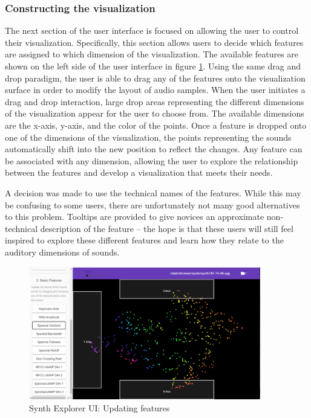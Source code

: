 \subsubsection{Constructing the visualization}
The next section of the user interface is focused on allowing the user to control their visualization. Specifically, this section allows users to decide which features are assigned to which dimension of the visualization. The available features are shown on the left side of the user interface in figure \ref{fig:features}. Using the same drag and drop paradigm, the user is able to drag any of the features onto the visualization surface in order to modify the layout of audio samples. When the user initiates a drag and drop interaction, large drop areas representing the different dimensions of the visualization appear for the user to choose from. The available dimensions are the x-axis, y-axis, and the color of the points. Once a feature is dropped onto one of the dimensions of the visualization, the points representing the sounds automatically shift into the new position to reflect the changes. Any feature can be associated with any dimension, allowing the user to explore the relationship between the features and develop a visualization that meets their needs.

A decision was made to use the technical names of the features. While this may be confusing to some users, there are unfortunately not many good alternatives to this problem. Tooltips are provided to give novices an approximate non-technical description of the feature -- the hope is that these users will still feel inspired to explore these different features and learn how they relate to the auditory dimensions of sounds.

\begin{figure}
    \centering
    \includegraphics[width=0.9\textwidth]{SynthExplore A.png}
    \caption{Synth Explorer UI: Updating features}
    \label{fig:features}
\end{figure}


